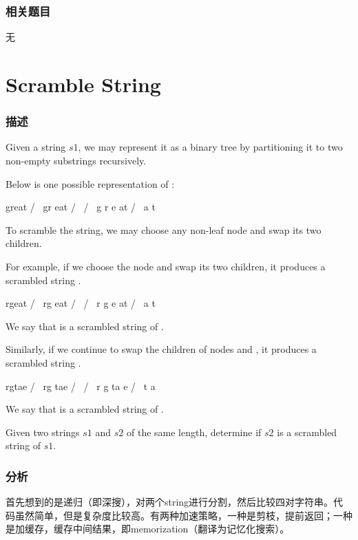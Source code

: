 \subsubsection{相关题目}
\begindot
\item 无
\myenddot


\section{Scramble String} %
\label{sec:scramble-string}


\subsubsection{描述}
Given a string $s1$, we may represent it as a binary tree by partitioning it to two non-empty substrings recursively.

Below is one possible representation of :
\begin{Code}
    great
   /    \
  gr    eat
 / \    /  \
g   r  e   at
           / \
          a   t
\end{Code}

To scramble the string, we may choose any non-leaf node and swap its two children.

For example, if we choose the node  and swap its two children, it produces a scrambled string .
\begin{Code}
    rgeat
   /    \
  rg    eat
 / \    /  \
r   g  e   at
           / \
          a   t
\end{Code}

We say that  is a scrambled string of .

Similarly, if we continue to swap the children of nodes  and , it produces a scrambled string .
\begin{Code}
    rgtae
   /    \
  rg    tae
 / \    /  \
r   g  ta  e
       / \
      t   a
\end{Code}

We say that  is a scrambled string of .

Given two strings $s1$ and $s2$ of the same length, determine if $s2$ is a scrambled string of $s1$.


\subsubsection{分析}
首先想到的是递归（即深搜），对两个string进行分割，然后比较四对字符串。代码虽然简单，但是复杂度比较高。有两种加速策略，一种是剪枝，提前返回；一种是加缓存，缓存中间结果，即memorization（翻译为记忆化搜索）。

